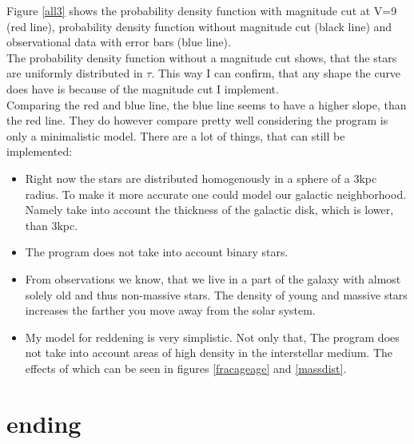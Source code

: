 \documentclass[a4paper,10pt]{article}
\begin{document}
 Figure \ref{all3} shows the probability density function with magnitude cut at V=9 (red line), probability density function without 
 magnitude cut (black line) and observational data with error bars (blue line).\\
 The probability density function without a magnitude cut shows, that the stars are uniformly distributed in $\tau$. This way I can confirm, 
 that any shape the curve does have is because of the magnitude cut I implement. \\
 Comparing the red and blue line, the blue line seems to have a higher slope, than the red line. They do however compare pretty well 
 considering the program is only a minimalistic model. There are a lot of things, that can still be implemented:\\
 \begin{itemize}
  \item Right now the stars are distributed homogenously in a sphere of a 3kpc radius. To make it more accurate one could model our
  galactic neighborhood. Namely take into account the thickness of the galactic disk, which is lower, than 3kpc.
  \item The program does not take into account binary stars. 
  \item From observations we know, that we live in a part of the galaxy with almost solely old and thus non-massive stars. The 
  density of young and massive stars increases the farther you move away from the solar system. 
  \item My model for reddening is very simplistic. Not only that, The program does not take into account areas of high density in 
  the interstellar medium. The effects of which can be seen in figures \ref{fracageage} and \ref{massdist}.
 \end{itemize}

 
 \section{ending}
 
 
\end{document}
